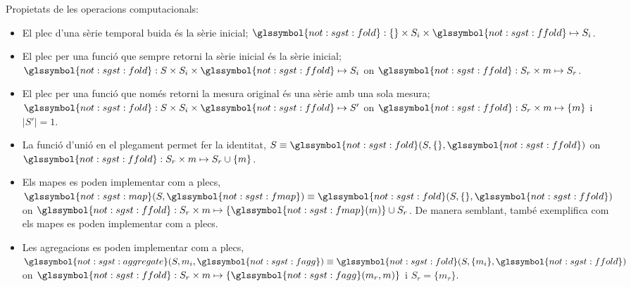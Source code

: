 Propietats de les operacions computacionals:
\begin{itemize}
\item El plec d'una sèrie temporal buida és la sèrie inicial;
  $\glssymbol{not:sgst:fold}: \{\} \times S_i \times
  \glssymbol{not:sgst:ffold} \mapsto S_i$.

\item El plec per una funció que sempre retorni la sèrie inicial és la
  sèrie inicial; $\glssymbol{not:sgst:fold}: S \times S_i \times \glssymbol{not:sgst:ffold} \mapsto S_i$ on
  $\glssymbol{not:sgst:ffold}: S_r \times m \mapsto S_r$.

\item El plec per una funció que només retorni la mesura original és
  una sèrie amb una sola mesura; $\glssymbol{not:sgst:fold}: S \times
  S_i \times \glssymbol{not:sgst:ffold} \mapsto S'$ on
  $\glssymbol{not:sgst:ffold}:S_r\times m \mapsto \{m\}$ i $|S'|=1$.


\item La funció d'unió en el plegament permet fer la identitat, $S
  \equiv \glssymbol{not:sgst:fold}(S,\{\},\glssymbol{not:sgst:ffold})$
  on $\glssymbol{not:sgst:ffold}: S_r \times m \mapsto S_r \cup \{m\}$.


\item Els mapes es poden implementar com a plecs,
  $\glssymbol{not:sgst:map}(S,\glssymbol{not:sgst:fmap}) \equiv
  \glssymbol{not:sgst:fold}(S,\{\},\glssymbol{not:sgst:ffold})$ on
  $\glssymbol{not:sgst:ffold}: S_r \times m \mapsto
  \{\glssymbol{not:sgst:fmap}(m)\} \cup S_r$.  De manera semblant,
  \textcite{lammel08:mapreduce} també exemplifica com els mapes es
  poden implementar com a plecs. %

\item Les agregacions es poden implementar com a plecs,
  $\glssymbol{not:sgst:aggregate}(S,m_i,\glssymbol{not:sgst:fagg})
  \equiv
  \glssymbol{not:sgst:fold}(S,\{m_i\},\glssymbol{not:sgst:ffold})$ on
  $\glssymbol{not:sgst:ffold}: S_r \times m \mapsto
  \{\glssymbol{not:sgst:fagg}(m_r,m)\}$ i $S_r =\{m_r\}$.

\end{itemize}





